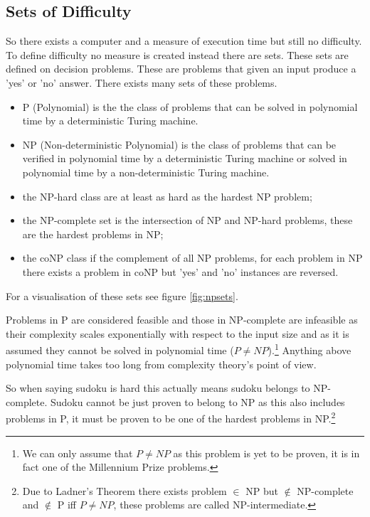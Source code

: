 \documentclass[a4paper,11pt]{report}
\begin{document}
\subsection{Sets of Difficulty} 

So there exists a computer and a measure of execution time but still no difficulty. To define difficulty no measure is created instead there are sets. These sets are defined on decision problems. These are problems that given an input produce a 'yes' or 'no' answer. There exists many sets of these problems.

\begin{itemize}
\item{P (Polynomial) is the the class of problems that can be solved in polynomial time by a deterministic Turing machine.}
\item{NP (Non-deterministic Polynomial) is the class of problems that can be verified in polynomial time by a deterministic Turing machine or solved in polynomial time by a non-deterministic Turing machine.}
\item{the NP-hard class are at least as hard as the hardest NP problem;} 
\item{the NP-complete set is the intersection of NP and NP-hard problems, these are the hardest problems in NP;} 
\item{the coNP class if the complement of all NP problems, for each problem in NP there exists a problem in coNP but 'yes' and 'no' instances are reversed.}
\end{itemize}

For a visualisation of these sets see figure \ref{fig:npsets}.

Problems in P are considered feasible and those in NP-complete are infeasible as their complexity scales exponentially with respect to the input size and as it is assumed they cannot be solved in polynomial time ($P \neq NP$).\footnote{We can only assume that $P\neq NP$ as this problem is yet to be proven, it is in fact one of the Millennium Prize problems.} Anything above polynomial time takes too long from complexity theory's point of view.

So when saying sudoku is hard this actually means sudoku belongs to NP-complete. Sudoku cannot be just proven to belong to NP as this also includes problems in P, it must be proven to be one of the hardest problems in NP.\footnote{Due to Ladner's Theorem there exists problem $\in$ NP but $\not\in$ NP-complete and $\not\in$ P iff $P\neq NP$, these problems are called NP-intermediate.}
\end{document}

